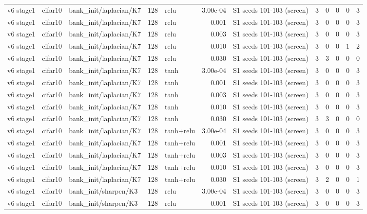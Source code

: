 \begin{table}[htbp]
{\begin{tabular}{@{}lllrlrlrrrrr@{}}
v6 stage1 & cifar10 & bank\_init/laplacian/K7 & 128 & relu & 3.00e-04 & S1 seeds 101-103 (screen) & 3 & 0 & 0 & 0 & 3 \\
v6 stage1 & cifar10 & bank\_init/laplacian/K7 & 128 & relu & 0.001 & S1 seeds 101-103 (screen) & 3 & 0 & 0 & 0 & 3 \\
v6 stage1 & cifar10 & bank\_init/laplacian/K7 & 128 & relu & 0.003 & S1 seeds 101-103 (screen) & 3 & 0 & 0 & 0 & 3 \\
v6 stage1 & cifar10 & bank\_init/laplacian/K7 & 128 & relu & 0.010 & S1 seeds 101-103 (screen) & 3 & 0 & 0 & 1 & 2 \\
v6 stage1 & cifar10 & bank\_init/laplacian/K7 & 128 & relu & 0.030 & S1 seeds 101-103 (screen) & 3 & 3 & 0 & 0 & 0 \\
v6 stage1 & cifar10 & bank\_init/laplacian/K7 & 128 & tanh & 3.00e-04 & S1 seeds 101-103 (screen) & 3 & 0 & 0 & 0 & 3 \\
v6 stage1 & cifar10 & bank\_init/laplacian/K7 & 128 & tanh & 0.001 & S1 seeds 101-103 (screen) & 3 & 0 & 0 & 0 & 3 \\
v6 stage1 & cifar10 & bank\_init/laplacian/K7 & 128 & tanh & 0.003 & S1 seeds 101-103 (screen) & 3 & 0 & 0 & 0 & 3 \\
v6 stage1 & cifar10 & bank\_init/laplacian/K7 & 128 & tanh & 0.010 & S1 seeds 101-103 (screen) & 3 & 0 & 0 & 0 & 3 \\
v6 stage1 & cifar10 & bank\_init/laplacian/K7 & 128 & tanh & 0.030 & S1 seeds 101-103 (screen) & 3 & 3 & 0 & 0 & 0 \\
v6 stage1 & cifar10 & bank\_init/laplacian/K7 & 128 & tanh+relu & 3.00e-04 & S1 seeds 101-103 (screen) & 3 & 0 & 0 & 0 & 3 \\
v6 stage1 & cifar10 & bank\_init/laplacian/K7 & 128 & tanh+relu & 0.001 & S1 seeds 101-103 (screen) & 3 & 0 & 0 & 0 & 3 \\
v6 stage1 & cifar10 & bank\_init/laplacian/K7 & 128 & tanh+relu & 0.003 & S1 seeds 101-103 (screen) & 3 & 0 & 0 & 0 & 3 \\
v6 stage1 & cifar10 & bank\_init/laplacian/K7 & 128 & tanh+relu & 0.010 & S1 seeds 101-103 (screen) & 3 & 0 & 0 & 0 & 3 \\
v6 stage1 & cifar10 & bank\_init/laplacian/K7 & 128 & tanh+relu & 0.030 & S1 seeds 101-103 (screen) & 3 & 2 & 0 & 0 & 1 \\
v6 stage1 & cifar10 & bank\_init/sharpen/K3 & 128 & relu & 3.00e-04 & S1 seeds 101-103 (screen) & 3 & 0 & 0 & 0 & 3 \\
v6 stage1 & cifar10 & bank\_init/sharpen/K3 & 128 & relu & 0.001 & S1 seeds 101-103 (screen) & 3 & 0 & 0 & 0 & 3 \\

\end{tabular}}
\end{table}
